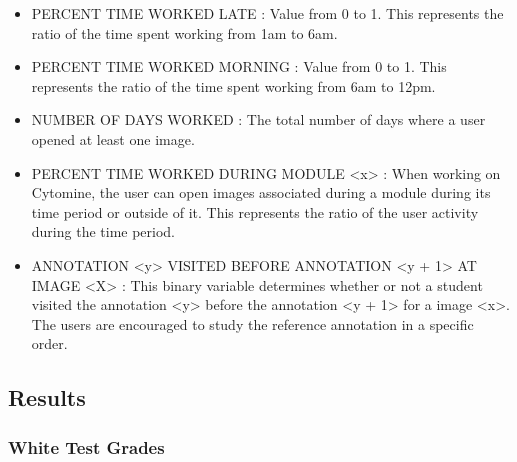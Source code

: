 \documentclass[a4paper,11pt]{report}
\numberwithin{figure}{section} %
\begin{document}
\begin{itemize}
    \item[\textbullet] PERCENT TIME WORKED LATE : Value from 0 to 1.
    This represents the ratio of the time spent working from 1am to 6am.
        
    \item[\textbullet] PERCENT TIME WORKED MORNING : Value from 0 to 1.
    This represents the ratio of the time spent working from 6am to 12pm.
    
    \item[\textbullet] NUMBER OF DAYS WORKED : The total number of days where a user opened at least one image.
    
    \item[\textbullet] PERCENT TIME WORKED DURING MODULE <x> : When working on Cytomine, the user can open images associated during a module during its time period or outside of it.
    This represents the ratio of the user activity during the time period.
    
	\item[\textbullet] ANNOTATION <y> VISITED BEFORE ANNOTATION <y + 1> AT IMAGE <X> : This binary variable determines whether or not a student visited the annotation <y> before the annotation <y + 1> for a image <x>.
	The users are encouraged to study the reference annotation in a specific order.
    
    \end{itemize}
    

    
    \subsection{Results}
    
    \subsubsection{White Test Grades}
    
\end{document}
